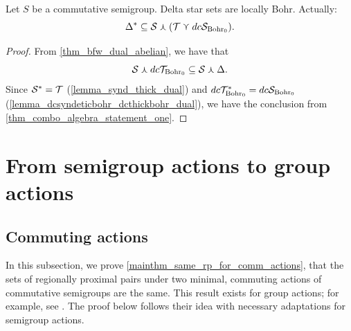 \begin{theorem}
\label{thm_delta_star_locally_bohr}
\leanok{}
    Let $S$ be a commutative semigroup. Delta star sets are locally Bohr.  Actually:
    \[\Delta^* \subseteq \mathcal{S} \curlywedge (\mathcal{T} \curlyvee dc\mathcal{S}_{\text{Bohr}_0}).\]
\end{theorem}

\begin{proof}
\leanok{}
    From \cref{thm_bfw_dual_abelian}, we have that
    \[\mathcal{S} \curlywedge dc\mathcal{T}_{\text{Bohr}_0} \subseteq \mathcal{S} \curlywedge \Delta.\]
    Since $\mathcal{S}^* = \mathcal{T}$ (\cref{lemma_synd_thick_dual}) and $dc\mathcal{T}_{\text{Bohr}_0}^* = dc\mathcal{S}_{\text{Bohr}_0}$ (\cref{lemma_dcsyndeticbohr_dcthickbohr_dual}), we have the conclusion from \cref{thm_combo_algebra_statement_one}.
\end{proof}

\section{From semigroup actions to group actions}
\label{sec_nat_extension}


\subsection{Commuting actions}
\label{sec_proof_of_comm_actions_thm}

In this subsection, we prove \cref{mainthm_same_rp_for_comm_actions}, that the sets of regionally proximal pairs under two minimal, commuting actions of commutative semigroups are the same. This result exists for group actions; for example, see \cite[Thm. 1.1]{shao_xu_2026}.  The proof below follows their idea with necessary adaptations for semigroup actions.


